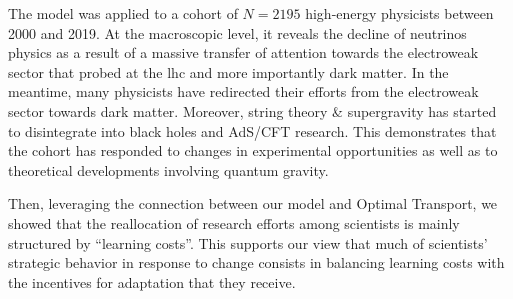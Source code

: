 \documentclass{article}
\begin{document}




The model was applied to a cohort of $N=2195$ high-energy physicists between 2000 and 2019. At the macroscopic level, it reveals the decline of neutrinos physics as a result of a massive transfer of attention towards the electroweak sector that probed at the \gls{lhc} and more importantly dark matter. In the meantime, many physicists have redirected their efforts from the electroweak sector towards dark matter. Moreover, string theory \& supergravity has started to disintegrate into black holes and AdS/CFT research. This demonstrates that the cohort has responded to changes in experimental opportunities as well as to theoretical developments involving quantum gravity.

Then, leveraging the connection between our model and Optimal Transport, we showed that the reallocation of research efforts among scientists is mainly structured by ``learning costs''. This supports our view that much of scientists' strategic behavior in response to change consists in balancing learning costs with the incentives for adaptation that they receive. 
\end{document}
